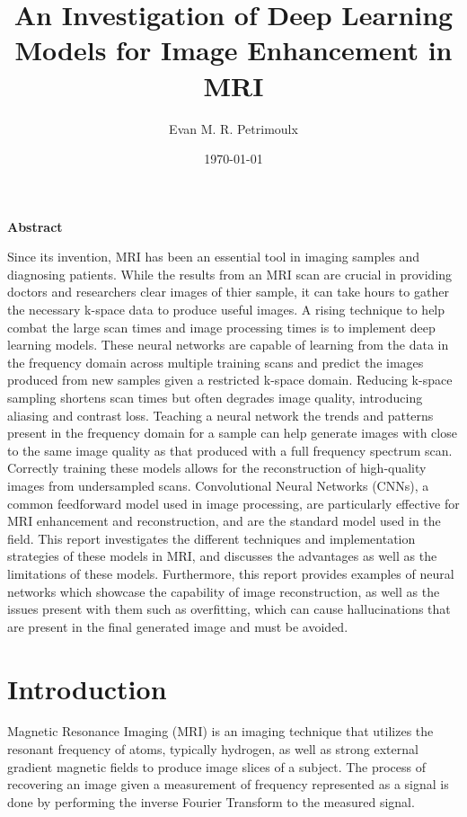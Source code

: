 \documentclass[14pt]{extreport}
\title{An Investigation of Deep Learning Models for Image Enhancement in MRI}
\author{Evan M. R. Petrimoulx}
\date{\today}
\renewenvironment{abstract}{
    \begin{center}
        \bfseries Abstract
    \end{center}
    \vspace{-1em} %
    \itshape
}{}
\begin{document}
    \maketitle
    \setcounter{page}{2}
    \vspace{-2cm}
    \begin{abstract}
        \indent Since its invention, MRI has been an essential tool in imaging samples and diagnosing patients. While the results from an MRI scan are crucial in providing doctors and researchers clear images of thier sample, it can take hours to gather the necessary k-space data to produce useful images. A rising technique to help combat the large scan times and image processing times is to implement deep learning models. These neural networks are capable of learning from the data in the frequency domain across multiple training scans and predict the images produced from new samples given a restricted k-space domain. Reducing k-space sampling shortens scan times but often degrades image quality, introducing aliasing and contrast loss. Teaching a neural network the trends and patterns present in the frequency domain for a sample can help generate images with close to the same image quality as that produced with a full frequency spectrum scan. Correctly training these models allows for the reconstruction of high-quality images from undersampled scans. Convolutional Neural Networks (CNNs), a common feedforward model used in image processing, are particularly effective for MRI enhancement and reconstruction, and are the standard model used in the field. This report investigates the different techniques and implementation strategies of these models in MRI, and discusses the advantages as well as the limitations of these models. Furthermore, this report provides examples of neural networks which showcase the capability of image reconstruction, as well as the issues present with them such as overfitting, which can cause hallucinations that are present in the final generated image and must be avoided.
    \end{abstract}

    \section*{Introduction}
        \indent Magnetic Resonance Imaging (MRI) is an imaging technique that utilizes the resonant frequency of atoms, typically hydrogen, as well as strong external gradient magnetic fields to produce image slices of a subject. The process of recovering an image given a measurement of frequency represented as a signal is done by performing the inverse Fourier Transform to the measured signal.
\end{document}
